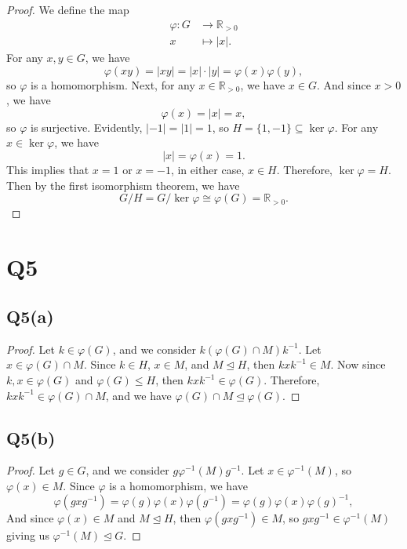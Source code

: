 \documentclass[12pt]{article}
\let\phi\varphi %
\newcommand{\R}{\mathbb{R}} %
\newcommand{\<}{\left\langle} %
\renewcommand{\>}{\right\rangle} %
\let\teq\trianglelefteq %
\let\iso\cong %
\begin{document}
\begin{proof}
    We define the map
    \begin{align*}
        \phi : G &\to \R_{>0} \\
        x &\mapsto |x|.
    \end{align*}
    For any $x,y\in G$, we have
    \[\phi(xy) = |xy| = |x|\cdot |y| = \phi(x)\phi(y),\]
    so $\phi$ is a homomorphism. Next, for any $x\in\R_{>0}$, we have $x\in G$. And since $x>0$, we have
    \[\phi(x) = |x| = x,\]
    so $\phi$ is surjective. Evidently, $|-1|=|1| = 1$, so $H = \{1,-1\} \subseteq \ker\phi$. For any $x\in\ker\phi$, we have
    \[|x| = \phi(x) = 1.\]
    This implies that $x=1$ or $x=-1$, in either case, $x\in H$. Therefore, $\ker\phi = H$. Then by the first isomorphism theorem, we have
    \[G/H = G/\ker\phi \iso \phi(G) = \R_{>0}.\]

\end{proof}

\newpage
\section*{Q5}

\subsection*{Q5(a)}

\begin{proof}
    Let $k\in \phi(G)$, and we consider $k(\phi(G) \cap M)k^{-1}$. Let $x\in \phi(G)\cap M$. Since $k\in H$, $x\in M$, and $M\teq H$, then $kxk^{-1} \in M$. Now since $k,x\in\phi(G)$ and $\phi(G)\leq H$, then $kxk^{-1} \in \phi(G)$. Therefore, $kxk^{-1}\in \phi(G)\cap M$, and we have $\phi(G)\cap M \teq \phi(G)$.
    
\end{proof}


\subsection*{Q5(b)}

\begin{proof}
    Let $g\in G$, and we consider $g\phi^{-1}(M)g^{-1}$. Let $x\in\phi^{-1}(M)$, so $\phi(x)\in M$. Since $\phi$ is a homomorphism, we have
    \[\phi(gxg^{-1}) = \phi(g)\phi(x)\phi(g^{-1}) = \phi(g)\phi(x)\phi(g)^{-1},\]
    And since $\phi(x)\in M$ and $M\teq H$, then $\phi(gxg^{-1}) \in M$, so $gxg^{-1} \in \phi^{-1}(M)$ giving us $\phi^{-1}(M)\teq G$.
    
\end{proof}
\end{document}
